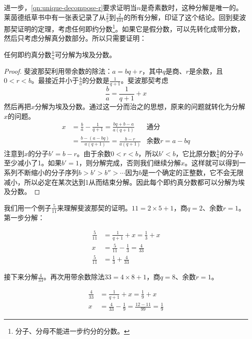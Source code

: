 \documentclass[b5paper]{ctexart}
\begin{document}
进一步，\cref{qn:unique-decompose-r}要求证明当$n$是奇素数时，这种分解是唯一的。莱茵德纸草书中有一张表记录了从$\frac{2}{5}$到$\frac{2}{101}$的所有分解，印证了这个结论。回到斐波那契证明的定理，考虑任何即约分数\footnote{分子、分母不能进一步约分的分数。}。如果它是假分数，可以先转化成带分数，然后只考虑分解真分数部分。所以只需要证明：

\begin{theorem}[斐波那契]
任何即约真分数$\frac{b}{a}$可分解为埃及分数。
\end{theorem}

\begin{proof}
斐波那契利用带余数的除法：$a = bq + r$，其中$q$是商、$r$是余数，且$0 < r < b$。最接近并小于$\frac{b}{a}$的分数是$\frac{1}{q + 1}$。斐波那契考虑
\[
  \frac{b}{a} = \frac{1}{q + 1} + x
\]
然后再把$x$分解为埃及分数。通过这一分而治之的思想，原来的问题就转化为分解$x$的问题。
\begin{align*}
  x & = \frac{b}{a} - \frac{1}{q + 1} = \frac{bq + b - a}{a(q + 1)} & \text{通分} \\
    & = \frac{b - (a - bq)}{a(q+1)} = \frac{b - r}{a(q+1)} & \text{余数}r = a - bq
\end{align*}
注意到$x$的分子$b' = b - r$。由于余数$0 < r < b$，所以$b' < b$，它比原分数$\frac{b}{a}$的分子$b$至少减小了1。如果$b' = 1$，则分解完成，否则我们继续分解$x$。这样就可以得到一系列不断缩小的分子序列$b > b' > b'' > \cdots$因为$b$是一个确定的正整数，它不会无限减小，所以必定在某次达到1从而结束分解。因此每个即约真分数都可以分解为埃及分数。
\end{proof}

我们用一个例子$\frac{5}{11}$来理解斐波那契的证明。$11 = 2 \times 5 + 1$，商$q = 2$、余数$r = 1$。第一步分解：

\begin{align*}
\frac{5}{11} & = \frac{1}{q + 1} + x = \frac{1}{3} + x  \\
 x &= \frac{5}{11} - \frac{1}{3} = \frac{4}{33} \\
\frac{5}{11} &= \frac{1}{3} + \frac{4}{33}
\end{align*}

接下来分解$\frac{4}{33}$。再次用带余数除法$33 = 4 \times 8 + 1$，商$q = 8$、余数$r = 1$。

\begin{align*}
\frac{4}{33} & = \frac{1}{q + 1} + x = \frac{1}{9} + x  \\
 x &= \frac{4}{33} - \frac{1}{9} = \frac{12 - 11}{99} = \frac{1}{9}
\end{align*}
\end{document}
